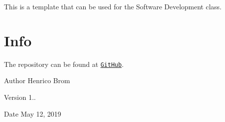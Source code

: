 This is a template that can be used for the Software Development class.\hypertarget{index_info}{}\section{Info}\label{index_info}
The repository can be found at \href{https://github.com/vesofton/Software-Ontwikkeling}{\tt Git\+Hub}.

\begin{DoxyAuthor}{Author}
Henrico Brom 
\end{DoxyAuthor}
\begin{DoxyVersion}{Version}
1.. 
\end{DoxyVersion}
\begin{DoxyDate}{Date}
May 12, 2019 
\end{DoxyDate}

